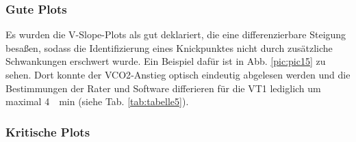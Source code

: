 \subsubsection{Gute Plots}

Es wurden die V-Slope-Plots als gut deklariert, die eine differenzierbare Steigung besaßen, sodass die Identifizierung eines Knickpunktes nicht durch zusätzliche Schwankungen erschwert wurde. Ein Beispiel dafür ist in Abb. \ref{pic:pic15} zu sehen. Dort konnte der \acs{VCO2}-Anstieg optisch eindeutig abgelesen werden und die Bestimmungen der Rater und Software differieren für die VT1 lediglich um maximal \SI{4}{\per\minute} (siehe Tab. \ref{tab:tabelle5}).

\subsubsection{Kritische Plots}

